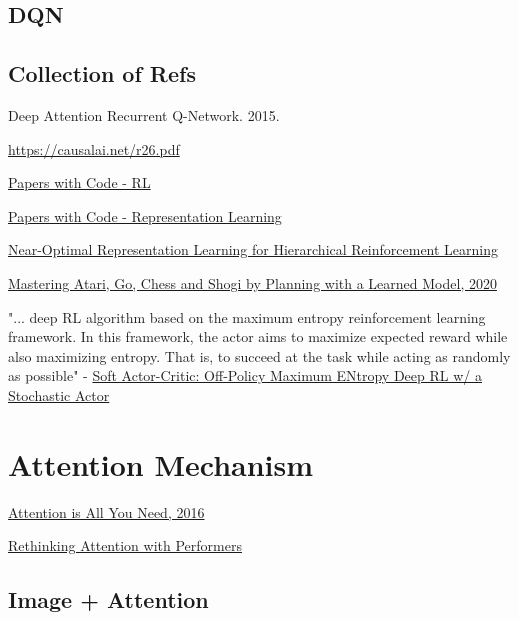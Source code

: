 \section{DQN }
\cite{mnih2015human}

\section{Collection of Refs}

Deep Attention Recurrent Q-Network. 2015. \cite{sorokin2015deep}  




\url{https://causalai.net/r26.pdf}

\href{https://paperswithcode.com/methods/area/reinforcement-learning}{Papers with Code - RL}

\href{https://paperswithcode.com/task/representation-learning}{Papers with Code - Representation Learning}

\href{https://paperswithcode.com/paper/near-optimal-representation-learning-for}{	Near-Optimal Representation Learning for Hierarchical Reinforcement Learning}

\href{https://arxiv.org/pdf/1911.08265.pdf}{Mastering Atari, Go, Chess and Shogi by Planning with a Learned Model, 2020}

"... deep RL algorithm based on the
maximum entropy reinforcement learning framework. In this framework, the actor aims to maximize expected reward while also maximizing entropy. That is, to succeed at the task while acting as randomly as possible" - \href{https://arxiv.org/pdf/1801.01290.pdf}{Soft Actor-Critic: Off-Policy Maximum ENtropy Deep RL w/ a Stochastic Actor} 


\chapter{Attention Mechanism}




\href{https://proceedings.neurips.cc/paper/2017/file/3f5ee243547dee91fbd053c1c4a845aa-Paper.pdf}{Attention is All You Need, 2016}

\href{https://arxiv.org/pdf/2009.14794.pdf}{Rethinking Attention with Performers}

\section{Image + Attention}
